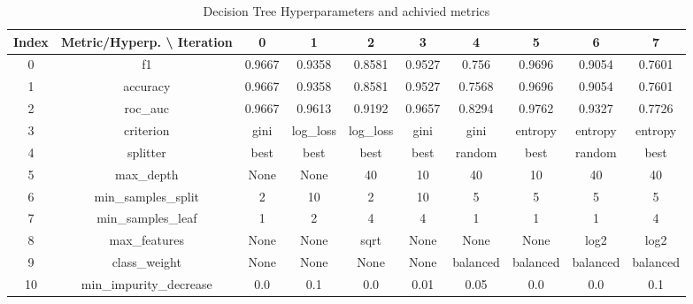 \documentclass{article}%
\begin{document}
%


\begin{table}[h!]%
\caption{Decision Tree Hyperparameters and achivied metrics}%
\vspace{0.2cm}%
\centering%
\begin{tabular}{|c||c||c||c||c||c||c||c||c||c|}%
\hline%
Index&Metric/Hyperp. \textbackslash{} Iteration&0&1&2&3&4&5&6&7\\%
\hline%
0&f1&0.9667&0.9358&0.8581&0.9527&0.756&0.9696&0.9054&0.7601\\%
1&accuracy&0.9667&0.9358&0.8581&0.9527&0.7568&0.9696&0.9054&0.7601\\%
2&roc\_auc&0.9667&0.9613&0.9192&0.9657&0.8294&0.9762&0.9327&0.7726\\%
3&criterion&gini&log\_loss&log\_loss&gini&gini&entropy&entropy&entropy\\%
4&splitter&best&best&best&best&random&best&random&best\\%
5&max\_depth&None&None&40&10&40&10&40&40\\%
6&min\_samples\_split&2&10&2&10&5&5&5&5\\%
7&min\_samples\_leaf&1&2&4&4&1&1&1&4\\%
8&max\_features&None&None&sqrt&None&None&None&log2&log2\\%
9&class\_weight&None&None&None&None&balanced&balanced&balanced&balanced\\%
10&min\_impurity\_decrease&0.0&0.1&0.0&0.01&0.05&0.0&0.0&0.1\\%
\hline%
\end{tabular}%
\end{table}

%
\end{document}
